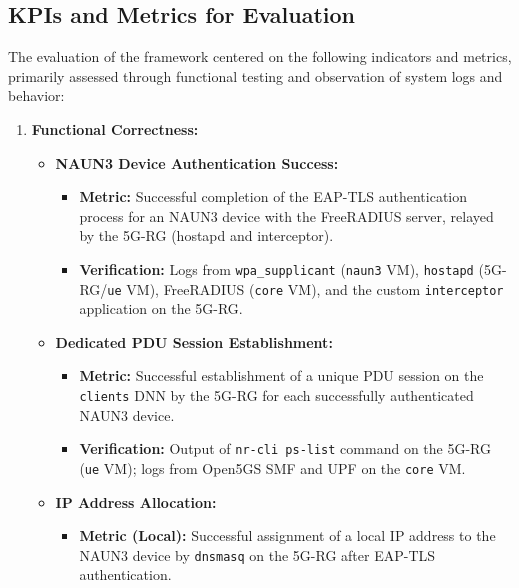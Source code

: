 \subsection{\acs{KPI}s and Metrics for Evaluation}

The evaluation of the framework centered on the following indicators and metrics, primarily assessed through functional testing and observation of system logs and behavior:

\begin{enumerate}
    \item{
        \textbf{Functional Correctness:}
        \begin{itemize}
            \item {
                \textbf{\ac{NAUN3} Device Authentication Success:}
                \begin{itemize}
                    \item \textbf{Metric:} Successful completion of the EAP-TLS authentication process for an NAUN3 device with the FreeRADIUS server, relayed by the 5G-RG (hostapd and interceptor).

                    \item \textbf{Verification:} Logs from \texttt{wpa\_supplicant} (\texttt{naun3} \ac{VM}), \texttt{hostapd} (\ac{5G-RG}/\texttt{ue} \ac{VM}), FreeRADIUS (\texttt{core} \ac{VM}), and the custom \texttt{interceptor} application on the \ac{5G-RG}. 
                \end{itemize}
            }
            \item {
                \textbf{Dedicated \ac{PDU} Session Establishment:}
                \begin{itemize}
                    \item \textbf{Metric:} Successful establishment of a unique \ac{PDU} session on the \texttt{clients} \ac{DNN} by the \ac{5G-RG} for each successfully authenticated \ac{NAUN3} device.

                    \item \textbf{Verification:} Output of \texttt{nr-cli ps-list} command on the \ac{5G-RG} (\texttt{ue} \ac{VM}); logs from Open5GS \ac{SMF} and \ac{UPF} on the \texttt{core} \ac{VM}. 
                \end{itemize}
            }
            \item {
                \textbf{\ac{IP} Address Allocation:}
                \begin{itemize}
                    \item \textbf{Metric (Local):} Successful assignment of a local \ac{IP} address to the \ac{NAUN3} device by \texttt{dnsmasq} on the \ac{5G-RG} after \ac{EAP-TLS} authentication.


\end{itemize}}
\end{itemize}}
\end{enumerate}
